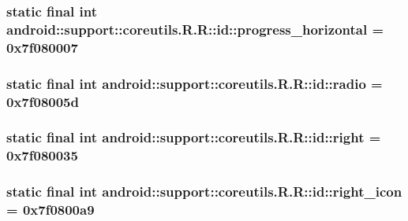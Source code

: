 \hypertarget{classandroid_1_1support_1_1coreutils_1_1_r_1_1id_6f96f82c539fa2459a2a664d21228f22}{
\subsubsection[{progress\_\-horizontal}]{\setlength{\rightskip}{0pt plus 5cm}static final int android::support::coreutils.R.R::id::progress\_\-horizontal = 0x7f080007}}
\label{classandroid_1_1support_1_1coreutils_1_1_r_1_1id_6f96f82c539fa2459a2a664d21228f22}


\hypertarget{classandroid_1_1support_1_1coreutils_1_1_r_1_1id_c886236e1cea5a468597dda2864a85f8}{
\subsubsection[{radio}]{\setlength{\rightskip}{0pt plus 5cm}static final int android::support::coreutils.R.R::id::radio = 0x7f08005d}}
\label{classandroid_1_1support_1_1coreutils_1_1_r_1_1id_c886236e1cea5a468597dda2864a85f8}


\hypertarget{classandroid_1_1support_1_1coreutils_1_1_r_1_1id_e92f31f91f9648ae1e4956aee05f160d}{
\subsubsection[{right}]{\setlength{\rightskip}{0pt plus 5cm}static final int android::support::coreutils.R.R::id::right = 0x7f080035}}
\label{classandroid_1_1support_1_1coreutils_1_1_r_1_1id_e92f31f91f9648ae1e4956aee05f160d}


\hypertarget{classandroid_1_1support_1_1coreutils_1_1_r_1_1id_98be06c749f67508c4a107ac23dbc58e}{
\subsubsection[{right\_\-icon}]{\setlength{\rightskip}{0pt plus 5cm}static final int android::support::coreutils.R.R::id::right\_\-icon = 0x7f0800a9}}
\label{classandroid_1_1support_1_1coreutils_1_1_r_1_1id_98be06c749f67508c4a107ac23dbc58e}


